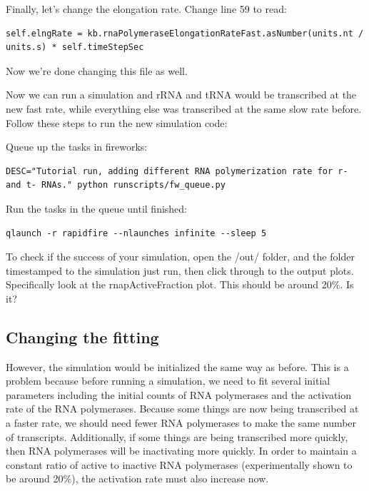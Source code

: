 \documentclass[12pt]{article}
\begin{document}
Finally, let’s change the elongation rate. Change line 59 to read:

\begin{lstlisting}
self.elngRate = kb.rnaPolymeraseElongationRateFast.asNumber(units.nt / units.s) * self.timeStepSec
\end{lstlisting}

Now we’re done changing this file as well.
\par
Now we can run a simulation and rRNA and tRNA would be transcribed at the new fast rate, while everything else was transcribed at the same slow rate before. Follow these steps to run the new simulation code:
\par
Queue up the tasks in fireworks:

\lstset{language=bash}
\begin{lstlisting}
DESC="Tutorial run, adding different RNA polymerization rate for r- and t- RNAs." python runscripts/fw_queue.py
\end{lstlisting}

Run the tasks in the queue until finished:

\begin{lstlisting}
qlaunch -r rapidfire --nlaunches infinite --sleep 5
\end{lstlisting}

To check if the success of your simulation, open the /out/ folder, and the folder timestamped to the simulation just run, then click through to the output plots. Specifically look at the rnapActiveFraction plot. This should be around 20\%. Is it?

\subsection{Changing the fitting}

However, the simulation would be initialized the same way as before. This is a problem because before running a simulation, we need to fit several initial parameters including the initial counts of RNA polymerases and the activation rate of the RNA polymerases. Because some things are now being transcribed at a faster rate, we should need fewer RNA polymerases to make the same number of transcripts. Additionally, if some things are being transcribed more quickly, then RNA polymerases will be inactivating more quickly. In order to maintain a constant ratio of active to inactive RNA polymerases (experimentally shown to be around 20\%), the activation rate must also increase now. 
\end{document}
